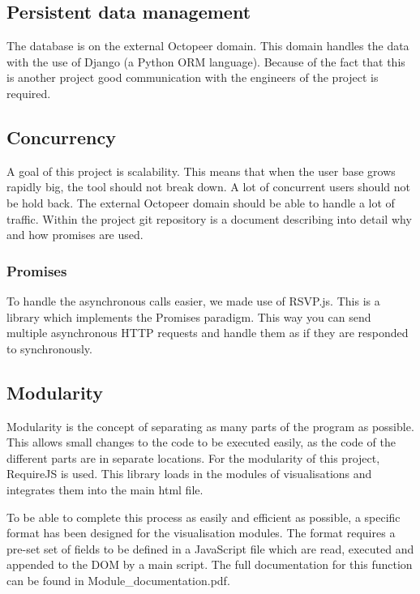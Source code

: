 \documentclass{article}
\begin{document}
\subsection{Persistent data management}

The database is on the external Octopeer domain. This domain handles the data with the use of Django (a Python ORM language). Because of the fact that this is another project good communication with the engineers of the project is required.

\subsection{Concurrency}

A goal of this project is scalability. This means that when the user base grows rapidly big, the tool should not break down. A lot of concurrent users should not be hold back. The external Octopeer domain should be able to handle a lot of traffic. Within the project git repository is a document describing into detail why and how promises are used.

\subsubsection{Promises}

To handle the asynchronous calls easier, we made use of RSVP.js. This is a library which implements the Promises paradigm. This way you can send multiple asynchronous HTTP requests and handle them as if they are responded to synchronously.

\subsection{Modularity}

Modularity is the concept of separating as many parts of the program as possible. This allows small changes to the code to be executed easily, as the code of the different parts are in separate locations. For the modularity of this project, RequireJS is used. This library loads in the modules of visualisations and integrates them into the main html file.

To be able to complete this process as easily and efficient as possible, a specific format has been designed for the visualisation modules. The format requires a pre-set set of fields to be defined in a JavaScript file which are read, executed and appended to the DOM by a main script. The full documentation for this function can be found in Module\_documentation.pdf.
\end{document}
